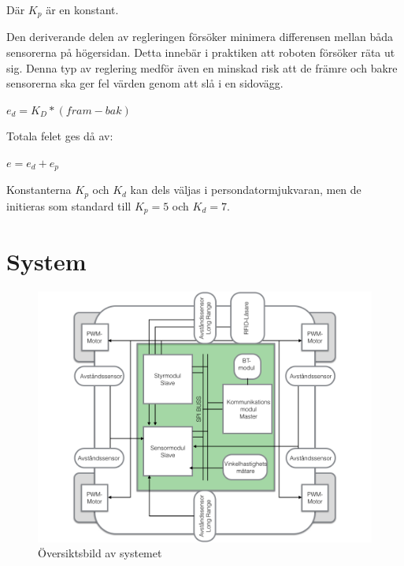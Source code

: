 \documentclass[a4paper,12pt,fleqn]{article}
\begin{document}
Där $K_{p}$ är en konstant.

Den deriverande delen av regleringen försöker minimera differensen mellan båda sensorerna på högersidan. Detta innebär i praktiken att roboten försöker räta ut sig. Denna typ av reglering medför även en minskad risk att de främre och bakre sensorerna ska ger fel värden genom att slå i en sidovägg.


$ e_d = K_{D}*(fram - bak) $

Totala felet ges då av: 

$e = e_d + e_p$

Konstanterna $K_{p}$ och $K_{d}$ kan dels väljas i persondatormjukvaran, men de initieras som standard till $K_{p}=5$ och $K_{d}=7$.


\newpage
\section{System}

\begin{figure}[htp] %
  \begin{center}
  \includegraphics[keepaspectratio=true,width=\linewidth]{bilder/overview}  %
  \end{center}
  \caption{Översiktsbild av systemet} %
  \label{fig:overview}
\end{figure}
\end{document}
